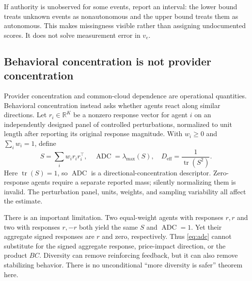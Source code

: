 \documentclass[11pt,a4paper]{article}
\theoremstyle{definition}
\theoremstyle{remark}
\newcommand{\R}{\mathbb{R}}
\newcommand{\tr}{\operatorname{tr}}
\newcommand{\ADC}{\operatorname{ADC}}
\begin{document}
If authority is unobserved for some events, report an interval: the lower bound treats unknown events as nonautonomous and the upper bound treats them as autonomous. This makes missingness visible rather than assigning undocumented scores. It does not solve measurement error in $v_e$.

\subsection{Behavioral concentration is not provider concentration}
Provider concentration and common-cloud dependence are operational quantities. Behavioral concentration instead asks whether agents react along similar directions. Let $r_i\in\R^K$ be a nonzero response vector for agent $i$ on an independently designed panel of controlled perturbations, normalized to unit length after reporting its original response magnitude. With $w_i\geq0$ and $\sum_iw_i=1$, define
\begin{equation}
 S=\sum_i w_i r_i r_i^\top,\quad
 \ADC=\lambda_{\max}(S),\quad
 D_{\mathrm{eff}}=\frac{1}{\tr(S^2)}.
 \label{eq:adc}
\end{equation}
Here $\tr(S)=1$, so $\ADC$ is a directional-concentration descriptor. Zero-response agents require a separate reported mass; silently normalizing them is invalid. The perturbation panel, units, weights, and sampling variability all affect the estimate.

There is an important limitation. Two equal-weight agents with responses $r,r$ and two with responses $r,-r$ both yield the same $S$ and $\ADC=1$. Yet their aggregate signed responses are $r$ and zero, respectively. Thus \cref{eq:adc} cannot substitute for the signed aggregate response, price-impact direction, or the product $BC$. Diversity can remove reinforcing feedback, but it can also remove stabilizing behavior. There is no unconditional ``more diversity is safer'' theorem here.
\end{document}
